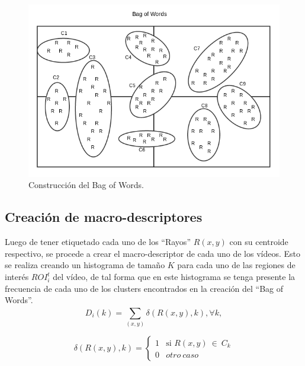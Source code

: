 	\begin{figure}[tb]
		\centering
    		\includegraphics[width=1\textwidth]{Figuras/Diagramas/bow_solo.png}
  		\caption{Construcción del Bag of Words.}
  		\label{algoritmo:fig:bow}
	\end{figure}	

	\subsection{Creación de macro-descriptores}
	\label{algoritmo:crea_macro-descriptores}
	Luego de tener etiquetado cada uno de los ``Rayos'' $R(x,y)$ con su centroide respectivo, se procede a crear el macro-descriptor de cada uno de los vídeos.	 Esto se realiza creando un histograma de tamaño $K$ para cada uno de las regiones de interés ${ROI}_{i}^{t}$ del vídeo, de tal forma que en este histograma se tenga presente la frecuencia de cada uno de los clusters encontrados en la creación del ``Bag of Words''.
	\begin{equation}
  			\label{algoritmo:eq:hist}
  			D_i(k) = \sum_{(x,y)}^{} \delta (R(x,y),k), \forall k,
	\end{equation}
	
	\begin{equation}
		\label{algoritmo:eq:fun_hist}
		 \delta (R(x,y),k) = \left \{ \begin{matrix} 1 & \mbox{si }R(x,y)~\in~C_k
\\ 0 & otro~caso\end{matrix}\right. 
	\end{equation}


